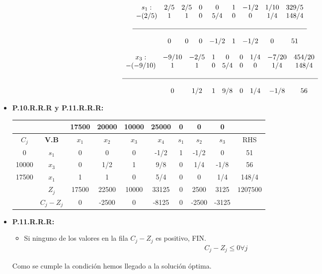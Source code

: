 \documentclass{templateNote}
\begin{document}
\begin{itemize}
    \begin{equation*}
        \begin{array}{ccccccccc}
            s_1: & 2/5 & 2/5 & 0 & 0 & 1 & -1/2 & 1/10 & 329/5 \\
            -(2/5) & 1 & 1 & 0 & 5/4 & 0 & 0 & 1/4 & 148/4 \\
            \\ \hline \\
            & 0 & 0 & 0 & -1/2 & 1 & -1/2 & 0 & 51
        \end{array}
    \end{equation*}
    
    \begin{equation*}
        \begin{array}{ccccccccc}
            x_3: & -9/10 & -2/5 & 1 & 0 & 0 & 1/4 & -7/20 & 454/20 \\
            -(-9/10) & 1 & 1 & 0 & 5/4 & 0 & 0 & 1/4 & 148/4 \\
            \\ \hline \\
            & 0 & 1/2 & 1 & 9/8 & 0 & 1/4 & -1/8 & 56
        \end{array}
    \end{equation*}

    \item \textbf{P.10.R.R.R y P.11.R.R.R:}
    \begin{center}
        \begin{tabular}{|c|c|c|c|c|c|c|c|c|c|}
            \hline
            & & 17500 & 20000 & 10000 & 25000 & 0 & 0 & 0 & \\ \hline
            $C_j$ & \textbf{V.B} & $x_1$ & $x_2$ & $x_3$ & $x_4$ & $s_1$ & $s_2$ & $s_3$ & RHS \\ \hline
            0 & $s_1$ & 0 & 0 & 0 & -1/2 & 1 & -1/2 & 0 & 51 \\
            10000 & $x_3$ & 0 & 1/2 & 1 & 9/8 & 0 & 1/4 & -1/8 & 56 \\
            17500 & $x_1$ & 1 & 1 & 0 & 5/4 & 0 & 0 & 1/4 & 148/4 \\ \hline
            & $Z_j$ & 17500 & 22500 & 10000 & 33125 & 0 & 2500 & 3125 & $\underline{1207500}$ \\ \hline
            & $C_j - Z_j$ & 0 & -2500 & 0 & -8125 & 0 & -2500 & -3125 & \\ \hline
        \end{tabular}
    \end{center}

    \item \textbf{P.11.R.R.R:}
    \begin{itemize}
        \item Si ninguno de los valores en la fila $C_j - Z_j$ es positivo, FIN.
        \begin{align*}
            C_j - Z_j \leq 0 \forall j
        \end{align*}
    \end{itemize}
    Como se cumple la condición hemos llegado a la solución óptima.
    

\end{itemize}
\end{document}
